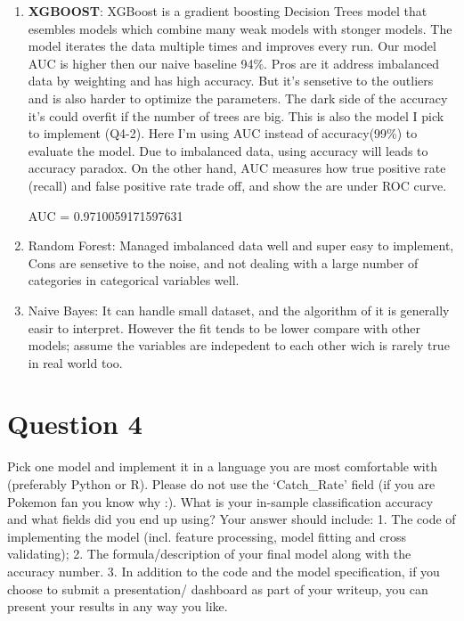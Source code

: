 \documentclass[11pt]{article}
\providecommand{\tightlist}{%
      \setlength{\itemsep}{0pt}\setlength{\parskip}{0pt}}
\begin{document}
\begin{enumerate}
\def\labelenumi{\arabic{enumi}.}
\tightlist
\item
  \textbf{XGBOOST}: XGBoost is a gradient boosting Decision Trees model
  that esembles models which combine many weak models with stonger
  models. The model iterates the data multiple times and improves every
  run. Our model AUC is higher then our naive baseline 94\%. Pros are it
  address imbalanced data by weighting and has high accuracy. But it's
  sensetive to the outliers and is also harder to optimize the
  parameters. The dark side of the accuracy it's could overfit if the
  number of trees are big. This is also the model I pick to implement
  (Q4-2). Here I'm using AUC instead of accuracy(99\%) to evaluate the
  model. Due to imbalanced data, using accuracy will leads to accuracy
  paradox. On the other hand, AUC measures how true positive rate
  (recall) and false positive rate trade off, and show the are under ROC
  curve.

  AUC = 0.9710059171597631
\item
  Random Forest: Managed imbalanced data well and super easy to
  implement, Cons are sensetive to the noise, and not dealing with a
  large number of categories in categorical variables well.
\item
  Naive Bayes: It can handle small dataset, and the algorithm of it is
  generally easir to interpret. However the fit tends to be lower
  compare with other models; assume the variables are indepedent to each
  other wich is rarely true in real world too.
\end{enumerate}

    \hypertarget{question-4}{%
\section{Question 4}\label{question-4}}

Pick one model and implement it in a language you are most comfortable
with (preferably Python or R). Please do not use the `Catch\_Rate' field
(if you are Pokemon fan you know why :). What is your in-sample
classification accuracy and what fields did you end up using? Your
answer should include: 1. The code of implementing the model (incl.
feature processing, model fitting and cross validating); 2. The
formula/description of your final model along with the accuracy number.
3. In addition to the code and the model specification, if you choose to
submit a presentation/ dashboard as part of your writeup, you can
present your results in any way you like.
\end{document}

